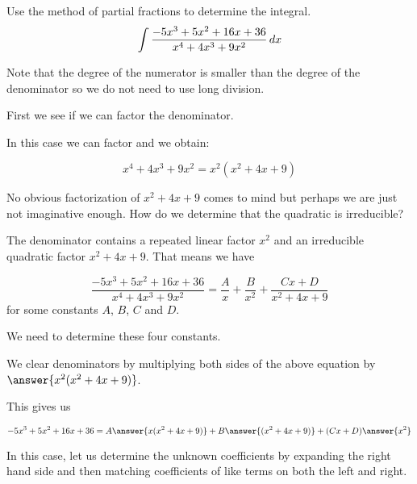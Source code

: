 \documentclass{ximera}
\author{Jim Talamo and Jason Miller}
\begin{document}
\begin{exercise}
Use the method of partial fractions to determine the integral.
\[
\int \frac{-5x^{3}+5x^{2}+16x+36}{x^{4}+4x^{3}+9x^{2}} \mathop{}\!d x
\]

Note that the degree of the numerator is smaller than the degree of the denominator so we do not need 
to use long division. 

First we see if we can factor the denominator. 

In this case we can factor and we obtain:

\[
x^{4}+4x^{3}+9x^{2}=x^{2}(x^{2}+4x+9)
\]

No obvious factorization of $x^2+4x+9$ comes to mind but perhaps we are just not imaginative enough.  How do we determine that the quadratic is irreducible?

\begin{multipleChoice}
\end{multipleChoice}


  \begin{multipleChoice}
  \end{multipleChoice}

\begin{exercise} 

The denominator contains a repeated linear factor $x^2$ and an irreducible quadratic factor $x^2+4x+9$. 
That means we have

\[
 \frac{-5x^{3}+5x^{2}+16x+36}{x^{4}+4x^{3}+9x^{2}}= \frac{A}{x} + \frac{B}{x^{2}} +\frac{Cx+D}{x^{2}+4x+9}
\]
for some constants $A$, $B$, $C$ and $D$.

We need to determine these four constants. 

We clear denominators by multiplying both sides of the above equation by $\answer{x^{2}(x^{2}+4x+9)}$. 

This gives us 

\[
-5x^{3}+5x^{2}+16x+36=A\answer{ x(x^{2}+4x+9)} + B\answer{ (x^{2}+4x+9)} +  (Cx+D)\answer{x^{2}}
\]

In this case, let us determine the unknown coefficients by expanding the right hand side and then matching coefficients of like terms on both the left and right. 


\end{exercise}
\end{exercise}
\end{document}
